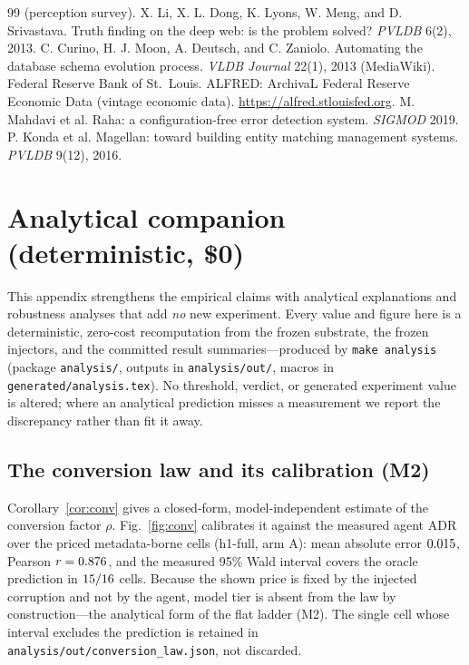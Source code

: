 \documentclass[11pt]{article}
\theoremstyle{plain}
\theoremstyle{definition}
\begin{document}
\begin{thebibliography}{99}
(perception survey).
 X. Li, X. L. Dong, K. Lyons, W. Meng, and D. Srivastava. Truth
finding on the deep web: is the problem solved? \emph{PVLDB} 6(2), 2013.
 C. Curino, H. J. Moon, A. Deutsch, and C. Zaniolo. Automating
the database schema evolution process. \emph{VLDB Journal} 22(1), 2013 (MediaWiki).
 Federal Reserve Bank of St.\ Louis. ALFRED: ArchivaL Federal
Reserve Economic Data (vintage economic data). \url{https://alfred.stlouisfed.org}.
 M. Mahdavi et al. Raha: a configuration-free error detection
system. \emph{SIGMOD} 2019.
 P. Konda et al. Magellan: toward building entity matching
management systems. \emph{PVLDB} 9(12), 2016.
\end{thebibliography}

\appendix
\section{Analytical companion (deterministic, \$0)}\label{app:analysis}
This appendix strengthens the empirical claims with analytical explanations and robustness
analyses that add \emph{no} new experiment. Every value and figure here is a deterministic,
zero-cost recomputation from the frozen substrate, the frozen injectors, and the committed
result summaries---produced by \texttt{make analysis} (package \texttt{analysis/}, outputs in
\texttt{analysis/out/}, macros in \texttt{generated/analysis.tex}). No threshold, verdict, or
generated experiment value is altered; where an analytical prediction misses a measurement we
report the discrepancy rather than fit it away.

\subsection{The conversion law and its calibration (M2)}
Corollary~\ref{cor:conv} gives a closed-form, model-independent estimate of the conversion
factor $\rho$. Fig.~\ref{fig:conv} calibrates it against the measured agent ADR over the
priced metadata-borne cells (h1-full, arm A): mean absolute error $0.015$, Pearson
$r=0.876$, and the measured 95\% Wald interval covers the oracle prediction in
$15/16$ cells. Because the shown price is fixed by the injected corruption and not by
the agent, model tier is absent from the law by construction---the analytical form of the flat
ladder (M2). The single cell whose interval excludes the prediction is retained in
\texttt{analysis/out/conversion\_law.json}, not discarded.
\end{document}
